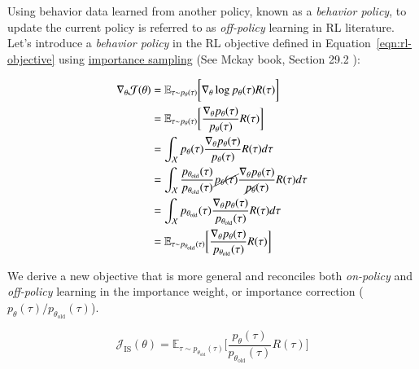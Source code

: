 \noindent Using behavior data learned from another policy, known as a \textit{behavior policy}, to update the current policy is referred to as \textit{off-policy} learning in RL literature. Let's introduce a \textit{behavior policy} in the RL objective defined in Equation~\ref{eqn:rl-objective} using \href{https://timvieira.github.io/blog/post/2014/12/21/importance-sampling/}{importance sampling} (See Mckay book, Section 29.2 \cite{mackay-book}):

\begin{equation}\label{eqn:derive-rl-objective-with-is}
    \begin{split}
        \nabla_{\theta}\mathcal{J}(\theta) &= \mathbb{E}_{\tau \sim p_{\theta}(\tau)}\bigg[ \nabla_{\theta}\log p_{\theta}(\tau) R(\tau)\bigg] \\
        &= \mathbb{E}_{\tau \sim p_{\theta}(\tau)} \bigg[ \frac{\nabla_{\theta}p_{\theta}(\tau)}{p_{\theta}(\tau)} R(\tau) \bigg] \\
        &= \int_{\mathcal{X}} p_{\theta}(\tau) \frac{\nabla_{\theta}p_{\theta}(\tau)}{p_{\theta}(\tau)} R(\tau) d\tau \\
        &= \int_{\mathcal{X}} \frac{p_{\theta_{\text{old}}}(\tau)}{p_{\theta_{\text{old}}}(\tau)} \cancel{p_{\theta}(\tau)} \frac{\nabla_{\theta}p_{\theta}(\tau)}{\cancel{p_{\theta}}(\tau)} R(\tau) d\tau \\
        &= \int_{\mathcal{X}} p_{\theta_{\text{old}}}(\tau) \frac{\nabla_{\theta}p_{\theta}(\tau)}{p_{\theta_{\text{old}}}(\tau)} R(\tau) d\tau \\
        &= \mathbb{E}_{\tau\sim p_{\theta_{\text{old}}}(\tau)} \bigg[\frac{\nabla_{\theta} p_{\theta}(\tau)}{p_{\theta_{\text{old}}}(\tau)} R(\tau)\bigg]
    \end{split}
\end{equation}

\noindent We derive a new objective that is more general and reconciles both \textit{on-policy} and \textit{off-policy} learning in the importance weight,
or importance correction ($p_{\theta}(\tau) / p_{\theta_{\text{old}}}(\tau)$). 

\begin{equation}\label{eqn:rl-objective-with-is}
    \mathcal{J}_{\text{IS}}(\theta) = \mathbb{E}_{\tau\sim p_{\theta_{\text{old}}}(\tau)}\bigg[\frac{p_{\theta}(\tau)}{p_{\theta_{\text{old}}}(\tau)} R(\tau)\bigg]
\end{equation}

